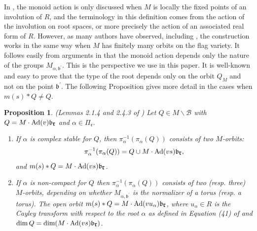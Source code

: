 \documentclass[12pt]{amsart}
\numberwithin{equation}{section}
\newtheorem{prop}[thm]{Proposition}
\newcommand{\fr}{\mbox{${\mathfrak r}$}}
\newcommand{\fb}{\mbox{${\mathfrak b}$}}
\newcommand{\Ad}{{\rm Ad}}
\newcommand{\B}{\mathcal{B}}
\begin{document}
In \cite{RS}, the monoid action is only discussed when $M$ is locally the fixed points of an involution of $R$, and the terminology in this definition comes from the action of the involution on root spaces, or more precisely the action of an associated real form of $R.$   However, as many authors have observed, including \cite{Knoporbits}, the construction works in the same way when $M$ has finitely many orbits on the flag variety.  It follows easily from arguments in \cite{RScomp} that the monoid action depends only the nature of the groups $M_{\alpha, \fb^{\prime}}.$   This is the perspective we use in this paper.
It is well-known and easy to prove that the type of the root depends only on the orbit $Q_M$ and not on the point $\fb^{\prime}.$ The following Proposition gives more detail in the cases when $m(s)*Q \not= Q.$

\begin{prop}\label{p:stableandnc}(Lemmas 2.1.4 and 2.4.3 of \cite{RScomp})
Let $Q\in M\backslash\B$ with $Q=M\cdot \Ad(v)\fb_{\fr}$ and $\alpha\in \Pi_{\fr}$.
\begin{enumerate}
\item If $\alpha$ is complex stable for $Q$, then $\pi_{\alpha}^{-1}(\pi_{\alpha}(Q))$ consists of two $M$-orbits:
$$
\pi_{\alpha}^{-1}(\pi_{\alpha}(Q))=Q\cup M\cdot \Ad(vs)\fb_{\fr},
$$
and $m(s)*Q= M\cdot \Ad(vs)\fb_{\fr}$. 
\item If $\alpha$ is non-compact   for $Q$ then $\pi_{\alpha}^{-1}(\pi_{\alpha}(Q))$ consists of two (resp. three) $M$-orbits, depending on whether $M_{\alpha, \fb^{\prime}}$ is the normalizer of a torus (resp. a torus). The open orbit
$m(s)*Q=M\cdot \Ad(vu_{\alpha})\fb_{\fr}$, where $u_{\alpha}\in R$ is the Cayley transform with respect to the root $\alpha$ as defined in Equation (41) of \cite{CEexp} and $\dim Q=\dim (M\cdot \Ad(vs)\fb_{\fr})$.   

\end{enumerate}


\end{prop}

 
\end{document}
